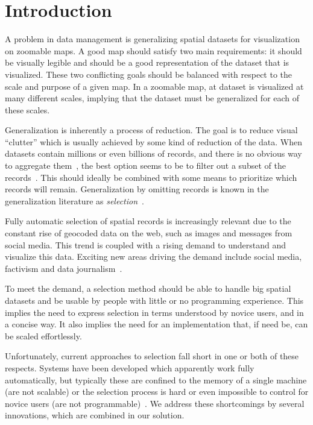 \section{Introduction}
A problem in data management is generalizing spatial datasets for visualization on zoomable maps. A good map should satisfy two main requirements: it should be visually legible and should be a good representation of the dataset that is visualized. These two conflicting goals should be balanced with respect to the scale and purpose of a given map. In a zoomable map, at dataset is visualized at many different scales, implying that the dataset must be generalized for each of these scales. 

Generalization is inherently a process of reduction. The goal is to reduce visual ``clutter'' which is usually achieved by some kind of reduction of the data. When datasets contain millions or even billions of records, and there is no obvious way to aggregate them~\cite{haunert2006landcover}, the best option seems to be to filter out a subset of the records~\cite{sarma2012fusiontables}. This should ideally be combined with some means to prioritize which records will remain. Generalization by omitting records is known in the generalization literature as \emph{selection}~\cite{weibel1999generalising}.

Fully automatic selection of spatial records is increasingly relevant due to the constant rise of geocoded data on the web, such as images and messages from social media. This trend is coupled with a rising demand to understand and visualize this data. Exciting new areas driving the demand include social media, factivism and data journalism~\cite{cohen2011journalism}. 

To meet the demand, a selection method should be able to handle big spatial datasets and be usable by people with little or no programming experience. This implies the need to express selection in terms understood by novice users, and in a concise way. It also implies the need for an implementation that, if need be, can be scaled effortlessly.

Unfortunately, current approaches to selection fall short in one or both of these respects. Systems have been developed which apparently work fully automatically, but typically these are confined to the memory of a single machine (are not scalable) or the selection process is hard or even impossible to control for novice users (are not programmable)~\cite{sarma2012fusiontables}. We address these shortcomings by several innovations, which are combined in our solution.

